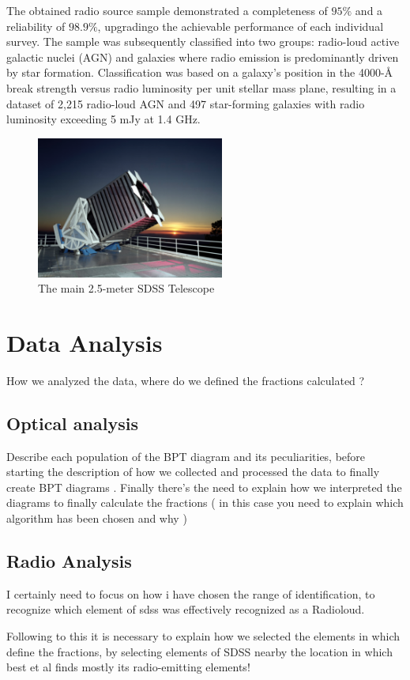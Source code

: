 The obtained radio source sample demonstrated a completeness of $95\%$ and a reliability of $98.9\%$, upgradingo the achievable performance of each individual survey. The sample was subsequently classified into two groups: radio-loud active galactic nuclei (AGN) and galaxies where radio emission is predominantly driven by star formation. Classification was based on a galaxy's position in the 4000-Å break strength versus radio luminosity per unit stellar mass plane, resulting in a dataset of 2,215 radio-loud AGN and 497 star-forming galaxies with radio luminosity exceeding 5 mJy at 1.4 GHz.

\begin{figure}[b]
  \centering
  \includegraphics[width=0.55\textwidth]{SDSS}
  \caption{The main 2.5-meter SDSS Telescope }
  \label{3}
\end{figure}


\newpage
\section{Data Analysis}
How we analyzed the data, where do we defined the fractions calculated ?
\subsection{Optical analysis}
Describe each population of the BPT diagram and its peculiarities, before starting the description of how we collected and processed the data to finally create BPT diagrams .
Finally there's the need to explain how we interpreted the diagrams to finally calculate the fractions ( in this case you need to explain which algorithm has been chosen and why ) 


\subsection{Radio Analysis}
I certainly need to focus on how i have chosen the range of identification, to recognize which element of sdss was effectively recognized as a Radioloud.

Following to this it is necessary to explain how we selected the elements in which define the fractions, by selecting elements of SDSS nearby the location in which best et al finds mostly its radio-emitting elements!